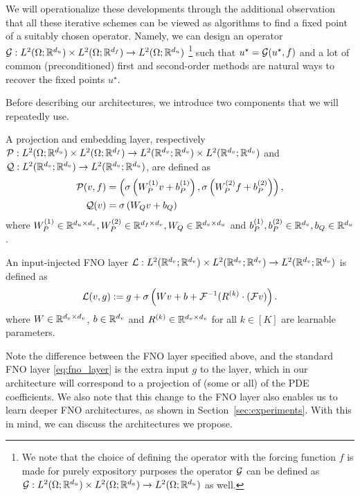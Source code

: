 We will operationalize these developments through the
additional observation that all these iterative schemes can be viewed as algorithms to find a fixed point of a suitably chosen operator. Namely, we can design an operator
${\mathcal{G}}: L^2(\Omega; \mathbb{R}^{d_u}) \times L^2(\Omega; \mathbb{R}^{d_f}) \to L^2(\Omega; \mathbb{R}^{d_u})$ 
\footnote{We note that the choice of defining the operator
with the forcing function $f$ is made for purely expository purposes
the operator ${\mathcal{G}}$ can be defined as 
${\mathcal{G}}: L^2(\Omega;\mathbb{R}^{d_u}) \times L^2(\Omega; \mathbb{R}^{d_a}) \to L^2(\Omega;\mathbb{R}^{d_u})$ as well.}
such that $u^\star = {\mathcal{G}}(u^\star, f)$ and a lot of common (preconditioned) first and second-order methods are natural ways to recover the fixed points $u^\star$. 

Before describing our architectures, we introduce two components that we will repeatedly use. 

\begin{definition} 
    A projection and embedding layer, respectively 
    ${\mathcal{P}}: L^2(\Omega;\mathbb{R}^{d_u}) \times L^2(\Omega;\mathbb{R}^{d_f}) \to L^2(\mathbb{R}^{d_v};\mathbb{R}^{d_v}) \times L^2(\mathbb{R}^{d_v};\mathbb{R}^{d_v})$
    and 
    ${\mathcal{Q}}: L^2(\mathbb{R}^{d_v};\mathbb{R}^{d_v}) \to L^2(\mathbb{R}^{d_v}; \mathbb{R}^{d_u})$, 
    are defined as
    \begin{align}
        {\mathcal{P}}(v, f) 
        &= \left(\sigma\left(W_P^{(1)}v + b_{P}^{(1)} \right),
            \sigma\left(W_P^{(2)}f + b_P^{(2)}\right)\right)\nonumber, 
            \\
        {\mathcal{Q}}(v) 
        &= \sigma\left(W_Qv + b_Q \right) \nonumber
    \end{align}
    where 
    $W_P^{(1)} \in \mathbb{R}^{d_u \times d_v}, W_P^{(2)} \in \mathbb{R}^{d_f \times d_v}, W_Q \in \mathbb{R}^{d_v\times d_u}$ 
    and 
    $b_P^{(1)},b_P^{(2)} \in \mathbb{R}^{d_v}, b_Q \in \mathbb{R}^{d_u}$.
\label{d:projection}
\end{definition}

\begin{definition}
\label{d:inputfno}
An input-injected FNO layer 
    ${\mathcal{L}}: L^2(\mathbb{R}^{d_v};\mathbb{R}^{d_v}) \times L^2(\mathbb{R}^{d_v};\mathbb{R}^{d_v}) \to L^2(\mathbb{R}^{d_v};\mathbb{R}^{d_v})$ is defined as 
    \begin{equation}
        \label{eq:fno_layer_updated}
       {\mathcal{L}}(v, g) := g + \sigma
            \left(W v + b + {\mathcal{F}}^{-1}(R^{(k)} \cdot ({\mathcal{F}} v)\right).
    \end{equation}
    where $W \in \mathbb{R}^{d_v \times d_v}$, $b \in \mathbb{R}^{d_v}$
    and $R^{(k)} \in \mathbb{R}^{d_v \times d_v}$ for all $k \in [K]$
    are learnable parameters. 
\end{definition}
Note the difference between the FNO layer specified above, and the standard FNO layer \eqref{eq:fno_layer} is the extra input $g$ to the layer, 
which in our architecture will correspond to a projection of (some or all) of the PDE coefficients.
We also note that this change to the FNO layer also enables us to learn deeper FNO architectures, as
shown in Section~\ref{sec:experiments}.
With this in mind, we can discuss the architectures we propose. 



